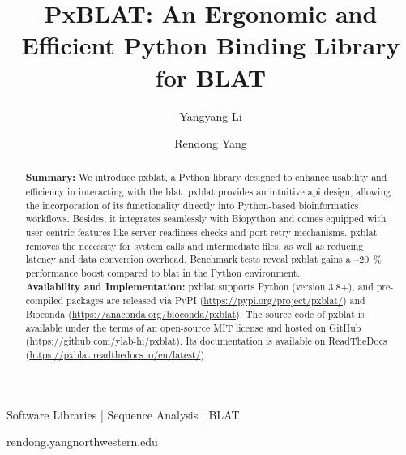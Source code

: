 
\title{PxBLAT: An Ergonomic and Efficient Python Binding Library for BLAT}

\author[1]{Yangyang Li}
\author[1,2 \Letter]{Rendong Yang }
\date{}

\maketitle

\begin{abstract}
	\textbf{Summary:}
	We introduce \gls{pxblat}, a Python library designed to enhance usability and efficiency in interacting with the \gls{blat}.
	\gls{pxblat} provides an intuitive \gls{api} design, allowing the incorporation of its functionality directly into Python-based bioinformatics workflows.
	Besides, it integrates seamlessly with Biopython and comes equipped with user-centric features like server readiness checks and port retry mechanisms.
	\gls{pxblat} removes the necessity for system calls and intermediate files, as well as reducing latency and data conversion overhead.
	Benchmark tests reveal \gls{pxblat} gains a \textasciitilde\SI[per-mode=symbol,round-precision=0]{20}{\percent} performance boost compared to \gls{blat} in the Python environment. \\
	\textbf{Availability and Implementation:}
	\gls{pxblat} supports Python (version 3.8+), and pre-compiled packages are released via PyPI (\url{https://pypi.org/project/pxblat/}) and Bioconda (\url{https://anaconda.org/bioconda/pxblat}).
	The source code of \gls{pxblat}  is available under the terms of an open-source MIT license and hosted on GitHub (\url{https://github.com/ylab-hi/pxblat}).
	Its documentation is available on ReadTheDocs (\url{https://pxblat.readthedocs.io/en/latest/}).
\end{abstract}

\begin{keywords}
	Software Libraries |  Sequence Analysis | BLAT
\end{keywords}

\begin{corrauthor}
	rendong.yang\at northwestern.edu
\end{corrauthor}

